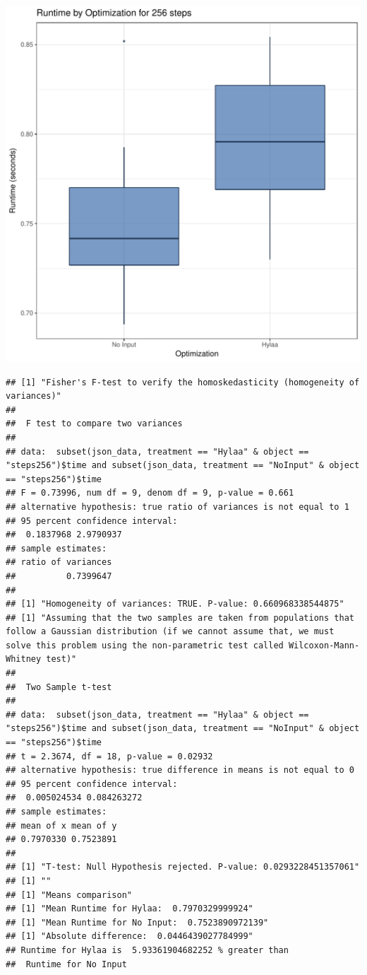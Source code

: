\documentclass{article}\usepackage[]{graphicx}\usepackage[]{color}
\makeatletter
\def\maxwidth{ %
  \ifdim\Gin@nat@width>\linewidth
    \linewidth
  \else
    \Gin@nat@width
  \fi
}
\newenvironment{kframe}{%
 \def\at@end@of@kframe{}%
 \ifinner\ifhmode%
  \def\at@end@of@kframe{\end{minipage}}%
  \begin{minipage}{\columnwidth}%
 \fi\fi%
 \def\FrameCommand##1{\hskip\@totalleftmargin \hskip-\fboxsep
 \colorbox{shadecolor}{##1}\hskip-\fboxsep
     \hskip-\linewidth \hskip-\@totalleftmargin \hskip\columnwidth}%
 \MakeFramed {\advance\hsize-\width
   \@totalleftmargin\z@ \linewidth\hsize
   \@setminipage}}%
 {\par\unskip\endMakeFramed%
 \at@end@of@kframe}
\newenvironment{knitrout}{}{} %
\makeatother
\begin{document}
\begin{knitrout}
\color{fgcolor}
\includegraphics[width=\maxwidth]{figure/RH4_steps256-1} 
\begin{kframe}\begin{verbatim}
## [1] "Fisher's F-test to verify the homoskedasticity (homogeneity of variances)"
## 
## 	F test to compare two variances
## 
## data:  subset(json_data, treatment == "Hylaa" & object == "steps256")$time and subset(json_data, treatment == "NoInput" & object == "steps256")$time
## F = 0.73996, num df = 9, denom df = 9, p-value = 0.661
## alternative hypothesis: true ratio of variances is not equal to 1
## 95 percent confidence interval:
##  0.1837968 2.9790937
## sample estimates:
## ratio of variances 
##          0.7399647 
## 
## [1] "Homogeneity of variances: TRUE. P-value: 0.660968338544875"
## [1] "Assuming that the two samples are taken from populations that follow a Gaussian distribution (if we cannot assume that, we must solve this problem using the non-parametric test called Wilcoxon-Mann-Whitney test)"
## 
## 	Two Sample t-test
## 
## data:  subset(json_data, treatment == "Hylaa" & object == "steps256")$time and subset(json_data, treatment == "NoInput" & object == "steps256")$time
## t = 2.3674, df = 18, p-value = 0.02932
## alternative hypothesis: true difference in means is not equal to 0
## 95 percent confidence interval:
##  0.005024534 0.084263272
## sample estimates:
## mean of x mean of y 
## 0.7970330 0.7523891 
## 
## [1] "T-test: Null Hypothesis rejected. P-value: 0.0293228451357061"
## [1] ""
## [1] "Means comparison"
## [1] "Mean Runtime for Hylaa:  0.7970329999924"
## [1] "Mean Runtime for No Input:  0.7523890972139"
## [1] "Absolute difference:  0.0446439027784999"
## Runtime for Hylaa is  5.93361904682252 % greater than 
##  Runtime for No Input
\end{verbatim}
\end{kframe}
\end{knitrout}
\end{document}
